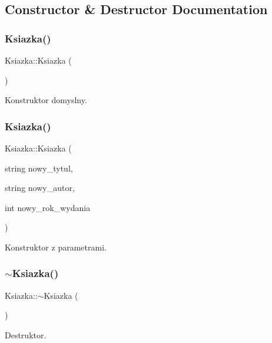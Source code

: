 \subsection{Constructor \& Destructor Documentation}
\mbox{\label{class_ksiazka_a97f373a60dd715626284eb900bcfbd6b}} 
\subsubsection{Ksiazka()\hspace{0.1cm}{\footnotesize\ttfamily [1/2]}}
{\footnotesize\ttfamily Ksiazka\+::\+Ksiazka (\begin{DoxyParamCaption}{ }\end{DoxyParamCaption})}



Konstruktor domyslny. 

\mbox{\label{class_ksiazka_aeff8f7a776d569b3eff2181b1afb0949}} 
\subsubsection{Ksiazka()\hspace{0.1cm}{\footnotesize\ttfamily [2/2]}}
{\footnotesize\ttfamily Ksiazka\+::\+Ksiazka (\begin{DoxyParamCaption}\item[{string}]{nowy\+\_\+tytul,  }\item[{string}]{nowy\+\_\+autor,  }\item[{int}]{nowy\+\_\+rok\+\_\+wydania }\end{DoxyParamCaption})}



Konstruktor z parametrami. 

\mbox{\label{class_ksiazka_accf293b1b1b7a8ac5ffe28decfd6400c}} 
\subsubsection{$\sim$\+Ksiazka()}
{\footnotesize\ttfamily Ksiazka\+::$\sim$\+Ksiazka (\begin{DoxyParamCaption}{ }\end{DoxyParamCaption})}



Destruktor. 



